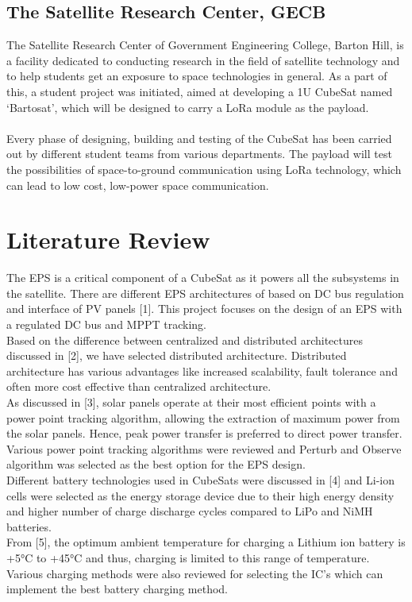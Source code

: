 \subsection{The Satellite Research Center, GECB}
\justifying
  The Satellite Research Center of Government Engineering College, Barton Hill, is a facility dedicated to conducting research in the field of satellite technology and to help students get an exposure to space technologies in general. As a part of this, a student project was initiated, aimed at developing a 1U CubeSat named ‘Bartosat’, which will be designed to carry a LoRa module as the payload. 
 \\ \\
   Every phase of designing, building and testing of the CubeSat has been carried out by different student teams from various departments. The payload will test the possibilities of space-to-ground communication using LoRa technology, which can lead to low cost, low-power space communication.
 \\

\section{Literature Review}
\justifying
The EPS is a critical component of a CubeSat as it powers all the subsystems in the satellite. There are different EPS architectures of based on DC bus regulation and interface of PV panels [1]. This project focuses on the design of an EPS with a regulated DC bus and MPPT tracking.
%
\\

Based on the difference between centralized and distributed architectures discussed in [2], we have selected distributed architecture. Distributed architecture has various advantages like increased scalability, fault tolerance and often more cost effective than centralized architecture.
\\

As discussed in [3], solar panels operate at their most efficient points with a power point tracking algorithm, allowing the extraction of maximum power from the solar panels. Hence, peak power transfer is preferred to direct power transfer. Various power point tracking algorithms were reviewed and Perturb and Observe algorithm was selected as the best option for the EPS design.
\\

Different battery technologies used in CubeSats were discussed in [4] and Li-ion cells were selected as the energy storage device due to their high energy density and higher number of charge discharge cycles compared to LiPo and NiMH batteries.
\\

From [5], the optimum ambient temperature for charging a Lithium ion battery is +5°C to +45°C and thus, charging is limited to this range of temperature. Various charging methods were also reviewed for selecting the IC's which can implement the best battery charging method.